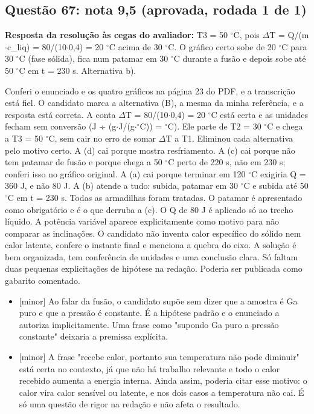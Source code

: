 \documentclass{article}%
\begin{document}
\subsection*{Questão 67: nota 9,5 (aprovada, rodada 1 de 1)}%
\textbf{Resposta da resolução às cegas do avaliador:} T3 = 50 $^\circ$C, pois $\Delta$T = Q/(m$\cdot$c\_liq) = 80/(10$\cdot$0,4) = 20 $^\circ$C acima de 30 $^\circ$C. O gráfico certo sobe de 20 $^\circ$C para 30 $^\circ$C (fase sólida), fica num patamar em 30 $^\circ$C durante a fusão e depois sobe até 50 $^\circ$C em t = 230 s. Alternativa b).\par %
Conferi o enunciado e os quatro gráficos na página 23 do PDF, e a transcrição está fiel. O candidato marca a alternativa (B), a mesma da minha referência, e a resposta está correta. A conta $\Delta$T = 80/(10$\cdot$0,4) = 20 $^\circ$C está certa e as unidades fecham sem conversão (J ÷ (g$\cdot$J/(g$\cdot$$^\circ$C)) = $^\circ$C). Ele parte de T2 = 30 $^\circ$C e chega a T3 = 50 $^\circ$C, sem cair no erro de somar $\Delta$T a T1. Eliminou cada alternativa pelo motivo certo. A (d) cai porque mostra resfriamento. A (c) cai porque não tem patamar de fusão e porque chega a 50 $^\circ$C perto de 220 s, não em 230 s; conferi isso no gráfico original. A (a) cai porque terminar em 120 $^\circ$C exigiria Q = 360 J, e não 80 J. A (b) atende a tudo: subida, patamar em 30 $^\circ$C e subida até 50 $^\circ$C em t = 230 s. Todas as armadilhas foram tratadas. O patamar é apresentado como obrigatório e é o que derruba a (c). O Q de 80 J é aplicado só ao trecho líquido. A potência variável aparece explicitamente como motivo para não comparar as inclinações. O candidato não inventa calor específico do sólido nem calor latente, confere o instante final e menciona a quebra do eixo. A solução é bem organizada, tem conferência de unidades e uma conclusão clara. Só faltam duas pequenas explicitações de hipótese na redação. Poderia ser publicada como gabarito comentado.%
\begin{itemize}%
\item%
{[}minor{]} Ao falar da fusão, o candidato supõe sem dizer que a amostra é Ga puro e que a pressão é constante. É a hipótese padrão e o enunciado a autoriza implicitamente. Uma frase como "supondo Ga puro a pressão constante" deixaria a premissa explícita.%
\item%
{[}minor{]} A frase "recebe calor, portanto sua temperatura não pode diminuir" está certa no contexto, já que não há trabalho relevante e todo o calor recebido aumenta a energia interna. Ainda assim, poderia citar esse motivo: o calor vira calor sensível ou latente, e nos dois casos a temperatura não cai. É só uma questão de rigor na redação e não afeta o resultado.%
\end{itemize}%
\end{document}
